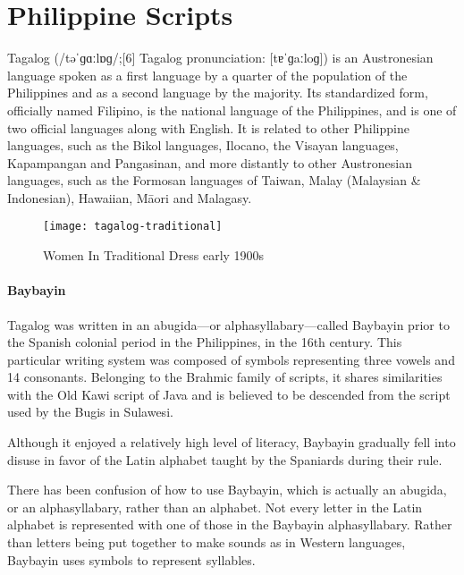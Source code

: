 \section{Philippine Scripts}
\label{s:tagalog}

\newfontfamily{}

Tagalog (/təˈɡɑːlɒɡ/;[6] Tagalog pronunciation: [tɐˈɡaːloɡ]) is an Austronesian language spoken as a first language by a quarter of the population of the Philippines and as a second language by the majority. Its standardized form, officially named Filipino, is the national language of the Philippines, and is one of two official languages along with English.
It is related to other Philippine languages, such as the Bikol languages, Ilocano, the Visayan languages, Kapampangan and Pangasinan, and more distantly to other Austronesian languages, such as the Formosan languages of Taiwan, Malay (Malaysian \& Indonesian), Hawaiian, Māori and Malagasy.

\begin{figure}[htbp]
\centering
\texttt{[image: tagalog-traditional]}
\caption{Women In Traditional Dress early 1900s }
\end{figure}


\paragraph{Baybayin} Tagalog was written in an abugida—or alphasyllabary—called Baybayin prior to the Spanish colonial period in the Philippines, in the 16th century. This particular writing system was composed of symbols representing three vowels and 14 consonants. Belonging to the Brahmic family of scripts, it shares similarities with the Old Kawi script of Java and is believed to be descended from the script used by the Bugis in Sulawesi.

Although it enjoyed a relatively high level of literacy, Baybayin gradually fell into disuse in favor of the Latin alphabet taught by the Spaniards during their rule.

There has been confusion of how to use Baybayin, which is actually an abugida, or an alphasyllabary, rather than an alphabet. Not every letter in the Latin alphabet is represented with one of those in the Baybayin alphasyllabary. Rather than letters being put together to make sounds as in Western languages, Baybayin uses symbols to represent syllables.

